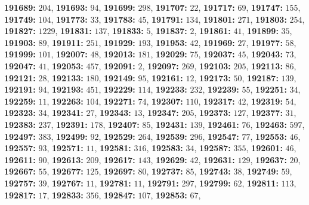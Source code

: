 \textsf{\bfseries 191689:} $204$, \textsf{\bfseries 191693:} $94$, \textsf{\bfseries 191699:} $298$, \textsf{\bfseries 191707:} $22$, \textsf{\bfseries 191717:} $69$, \textsf{\bfseries 191747:} $155$, \textsf{\bfseries 191749:} $104$, \textsf{\bfseries 191773:} $33$, \textsf{\bfseries 191783:} $45$, \textsf{\bfseries 191791:} $134$, \textsf{\bfseries 191801:} $271$, \textsf{\bfseries 191803:} $254$, \textsf{\bfseries 191827:} $1229$, \textsf{\bfseries 191831:} $137$, \textsf{\bfseries 191833:} $5$, \textsf{\bfseries 191837:} $2$, \textsf{\bfseries 191861:} $41$, \textsf{\bfseries 191899:} $35$, \textsf{\bfseries 191903:} $89$, \textsf{\bfseries 191911:} $251$, \textsf{\bfseries 191929:} $193$, \textsf{\bfseries 191953:} $42$, \textsf{\bfseries 191969:} $27$, \textsf{\bfseries 191977:} $58$, \textsf{\bfseries 191999:} $101$, \textsf{\bfseries 192007:} $48$, \textsf{\bfseries 192013:} $181$, \textsf{\bfseries 192029:} $75$, \textsf{\bfseries 192037:} $45$, \textsf{\bfseries 192043:} $73$, \textsf{\bfseries 192047:} $41$, \textsf{\bfseries 192053:} $457$, \textsf{\bfseries 192091:} $2$, \textsf{\bfseries 192097:} $269$, \textsf{\bfseries 192103:} $205$, \textsf{\bfseries 192113:} $86$, \textsf{\bfseries 192121:} $28$, \textsf{\bfseries 192133:} $180$, \textsf{\bfseries 192149:} $95$, \textsf{\bfseries 192161:} $12$, \textsf{\bfseries 192173:} $50$, \textsf{\bfseries 192187:} $139$, \textsf{\bfseries 192191:} $94$, \textsf{\bfseries 192193:} $451$, \textsf{\bfseries 192229:} $114$, \textsf{\bfseries 192233:} $232$, \textsf{\bfseries 192239:} $55$, \textsf{\bfseries 192251:} $34$, \textsf{\bfseries 192259:} $11$, \textsf{\bfseries 192263:} $104$, \textsf{\bfseries 192271:} $74$, \textsf{\bfseries 192307:} $110$, \textsf{\bfseries 192317:} $42$, \textsf{\bfseries 192319:} $54$, \textsf{\bfseries 192323:} $34$, \textsf{\bfseries 192341:} $27$, \textsf{\bfseries 192343:} $13$, \textsf{\bfseries 192347:} $205$, \textsf{\bfseries 192373:} $127$, \textsf{\bfseries 192377:} $31$, \textsf{\bfseries 192383:} $237$, \textsf{\bfseries 192391:} $178$, \textsf{\bfseries 192407:} $85$, \textsf{\bfseries 192431:} $139$, \textsf{\bfseries 192461:} $76$, \textsf{\bfseries 192463:} $597$, \textsf{\bfseries 192497:} $383$, \textsf{\bfseries 192499:} $92$, \textsf{\bfseries 192529:} $264$, \textsf{\bfseries 192539:} $296$, \textsf{\bfseries 192547:} $77$, \textsf{\bfseries 192553:} $46$, \textsf{\bfseries 192557:} $93$, \textsf{\bfseries 192571:} $11$, \textsf{\bfseries 192581:} $316$, \textsf{\bfseries 192583:} $34$, \textsf{\bfseries 192587:} $355$, \textsf{\bfseries 192601:} $46$, \textsf{\bfseries 192611:} $90$, \textsf{\bfseries 192613:} $209$, \textsf{\bfseries 192617:} $143$, \textsf{\bfseries 192629:} $42$, \textsf{\bfseries 192631:} $129$, \textsf{\bfseries 192637:} $20$, \textsf{\bfseries 192667:} $55$, \textsf{\bfseries 192677:} $125$, \textsf{\bfseries 192697:} $80$, \textsf{\bfseries 192737:} $85$, \textsf{\bfseries 192743:} $38$, \textsf{\bfseries 192749:} $59$, \textsf{\bfseries 192757:} $39$, \textsf{\bfseries 192767:} $11$, \textsf{\bfseries 192781:} $11$, \textsf{\bfseries 192791:} $297$, \textsf{\bfseries 192799:} $62$, \textsf{\bfseries 192811:} $113$, \textsf{\bfseries 192817:} $17$, \textsf{\bfseries 192833:} $356$, \textsf{\bfseries 192847:} $107$, \textsf{\bfseries 192853:} $67$, 
